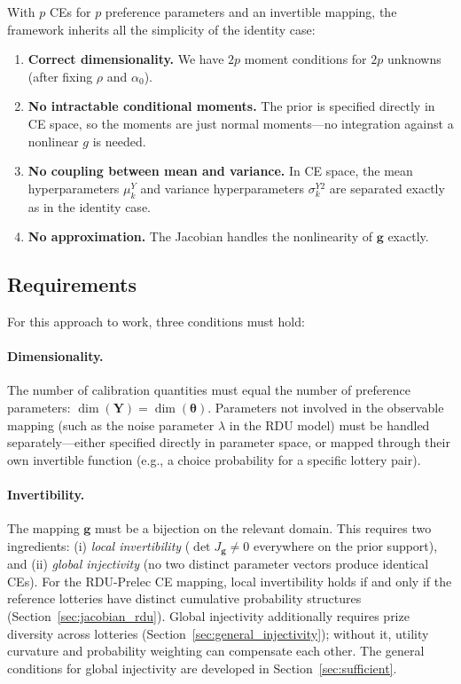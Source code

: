 \documentclass[11pt,a4paper]{article}
\theoremstyle{definition}
\newcommand{\btheta}{\boldsymbol{\theta}}
\begin{document}
With $p$ CEs for $p$ preference parameters and an invertible mapping, the
framework inherits all the simplicity of the identity case:
\begin{enumerate}
    \item \textbf{Correct dimensionality.} We have $2p$ moment conditions for
    $2p$ unknowns (after fixing $\rho$ and $\alpha_0$).

    \item \textbf{No intractable conditional moments.} The prior is specified
    directly in CE space, so the moments are just normal moments---no
    integration against a nonlinear $g$ is needed.

    \item \textbf{No coupling between mean and variance.} In CE space, the
    mean hyperparameters $\mu_k^Y$ and variance hyperparameters $\sigma_k^{Y2}$
    are separated exactly as in the identity case.

    \item \textbf{No approximation.} The Jacobian handles the nonlinearity of
    $\mathbf{g}$ exactly.
\end{enumerate}

\subsection{Requirements}

For this approach to work, three conditions must hold:

\paragraph{Dimensionality.} The number of calibration quantities must equal the
number of preference parameters: $\dim(\mathbf{Y}) = \dim(\btheta)$. Parameters
not involved in the observable mapping (such as the noise parameter $\lambda$ in
the RDU model) must be handled separately---either specified directly in
parameter space, or mapped through their own invertible function (e.g., a choice
probability for a specific lottery pair).

\paragraph{Invertibility.} The mapping $\mathbf{g}$ must be a bijection on the
relevant domain. This requires two ingredients: (i) \emph{local invertibility}
($\det J_{\mathbf{g}} \neq 0$ everywhere on the prior support), and
(ii) \emph{global injectivity} (no two distinct parameter vectors produce
identical CEs). For the RDU-Prelec CE mapping, local invertibility holds if
and only if the reference lotteries have distinct cumulative probability
structures (Section~\ref{sec:jacobian_rdu}). Global injectivity additionally
requires prize diversity across lotteries
(Section~\ref{sec:general_injectivity}); without it, utility curvature and
probability weighting can compensate each other. The general conditions for
global injectivity are developed in Section~\ref{sec:sufficient}.
\end{document}
